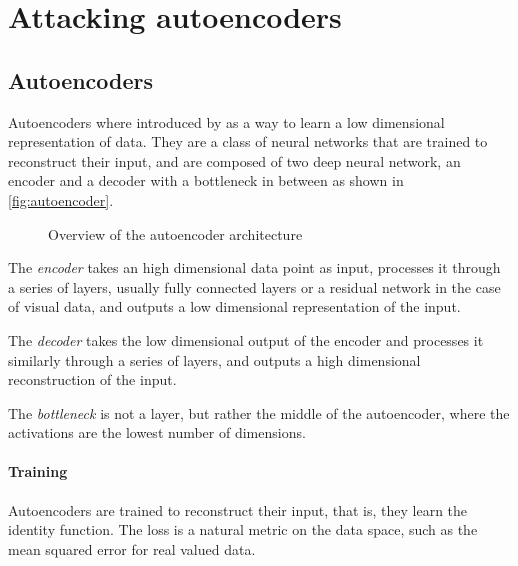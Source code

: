 \documentclass[]{scrarticle}
\begin{document}
\section{Attacking autoencoders}

\subsection{Autoencoders}

Autoencoders where introduced by \cite{hinton2006reducing} as a way to learn
a low dimensional representation of data.
They are a class of neural networks that are trained to reconstruct their input,
and are composed of two deep neural network, an encoder and a decoder with a bottleneck in between
as shown in \autoref{fig:autoencoder}.

\begin{figure}[h]
  \centering
  \caption{Overview of the autoencoder architecture}
  \label{fig:autoencoder}
\end{figure}

The \emph{encoder} takes an high dimensional data point as input,
processes it through a series of layers, usually fully connected layers
or a residual network \cite{He2015DeepRL} in the case of visual data,
and outputs a low dimensional representation of the input.

The \emph{decoder} takes the low dimensional output of the encoder and
processes it similarly through a series of layers,
and outputs a high dimensional reconstruction of the input.

The \emph{bottleneck} is not a layer, but rather the middle of the autoencoder,
where the activations are the lowest number of dimensions.

\paragraph{Training}
Autoencoders are trained to reconstruct their input,
that is, they learn the identity function. The loss is a natural metric
on the data space, such as the mean squared error for real valued data.
\end{document}
